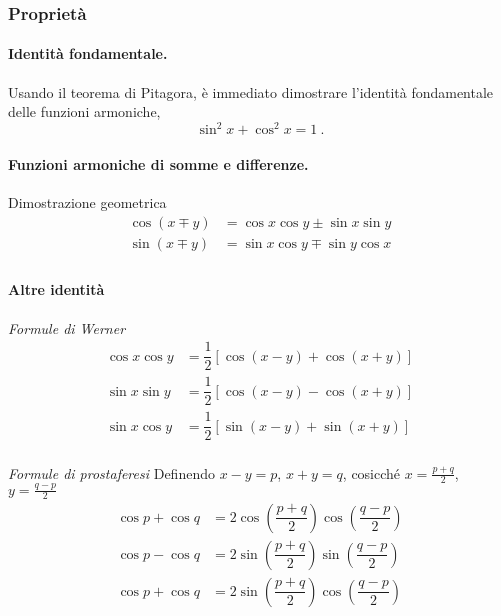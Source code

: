 \subsubsection{Proprietà}
\paragraph{Identità fondamentale.} Usando il teorema di Pitagora, è immediato dimostrare l'identità fondamentale delle funzioni armoniche,
\begin{equation}
    \sin^2 x + \cos^2 x = 1 \ .
\end{equation}

\paragraph{Funzioni armoniche di somme e differenze.}
{\color{red} Dimostrazione geometrica}
\begin{equation}
\begin{aligned}
    \cos(x \mp y) & = \cos x \cos y \pm \sin x \sin y \\
    \sin(x \mp y) & = \sin x \cos y \mp \sin y \cos x \\
\end{aligned}
\end{equation}

\paragraph{Altre identità}
\textit{Formule di Werner}
\begin{equation}
\begin{aligned}
    \cos x \cos y & = \dfrac{1}{2} \left[ \cos(x-y) + \cos(x+y) \right] \\
    \sin x \sin y & = \dfrac{1}{2} \left[ \cos(x-y) - \cos(x+y) \right] \\
    \sin x \cos y & = \dfrac{1}{2} \left[ \sin(x-y) + \sin(x+y) \right] \\
\end{aligned}
\end{equation}

\noindent
\textit{Formule di prostaferesi} Definendo $x-y = p$, $x+y = q$, cosicché $x = \frac{p+q}{2}$, $y = \frac{q-p}{2}$
\begin{equation}
\begin{aligned}
    \cos p + \cos q & = 2 \cos\left(\dfrac{p+q}{2}\right) \cos\left(\dfrac{q-p}{2}\right) \\
    \cos p - \cos q & = 2 \sin\left(\dfrac{p+q}{2}\right) \sin\left(\dfrac{q-p}{2}\right) \\
    \cos p + \cos q & = 2 \sin\left(\dfrac{p+q}{2}\right) \cos\left(\dfrac{q-p}{2}\right) \\
\end{aligned}
\end{equation}



